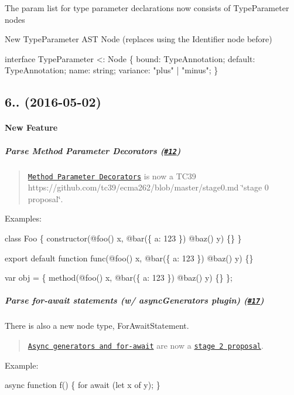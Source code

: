 \begin{DoxyItemize}
\item The param list for type parameter declarations now consists of {\ttfamily Type\+Parameter} nodes
\item New {\ttfamily Type\+Parameter} A\+ST Node (replaces using the {\ttfamily Identifier} node before)
\end{DoxyItemize}


\begin{DoxyCode}
interface TypeParameter <: Node \{
  bound: TypeAnnotation;
  default: TypeAnnotation;
  name: string;
  variance: "plus" | "minus";
\}
\end{DoxyCode}


\subsection*{6.. (2016-\/05-\/02)}

\paragraph*{New Feature}

\subparagraph*{Parse Method Parameter Decorators (\href{https://github.com/babel/babylon/pull/12}{\tt \#12})}

\begin{quote}
\href{https://goo.gl/8MmCMG}{\tt Method Parameter Decorators} is now a T\+C39 https\+://github.com/tc39/ecma262/blob/master/stage0.\+md \char`\"{}stage 0 proposal\char`\"{}. \end{quote}


Examples\+:


\begin{DoxyCode}
class Foo \{
  constructor(@foo() x, @bar(\{ a: 123 \}) @baz() y) \{\}
\}

export default function func(@foo() x, @bar(\{ a: 123 \}) @baz() y) \{\}

var obj = \{
  method(@foo() x, @bar(\{ a: 123 \}) @baz() y) \{\}
\};
\end{DoxyCode}


\subparagraph*{Parse for-\/await statements (w/ {\ttfamily async\+Generators} plugin) (\href{https://github.com/babel/babylon/pull/17}{\tt \#17})}

There is also a new node type, {\ttfamily For\+Await\+Statement}.

\begin{quote}
\href{https://github.com/tc39/proposal-async-iteration}{\tt Async generators and for-\/await} are now a \href{https://github.com/tc39/ecma262#current-proposals}{\tt stage 2 proposal}. \end{quote}


Example\+:


\begin{DoxyCode}
async function f() \{
  for await (let x of y);
\}
\end{DoxyCode}
 